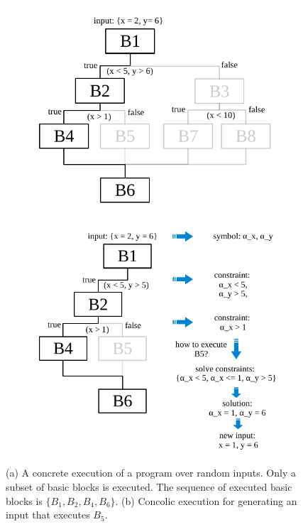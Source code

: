 \begin{figure}[t]
  \vspace{-3mm}
  \centering
  \begin{subfigure}{.5\textwidth}
    \centering
    \includegraphics[width=0.7\columnwidth]{images/concrete-execution} 
    \vspace{15mm}
    \caption{}
  \end{subfigure}%
  \begin{subfigure}{.5\textwidth}
    \centering
    \includegraphics[width=0.8\columnwidth]{images/concolic-execution} 
    \caption{}
  \end{subfigure}
  \caption{(a) A concrete execution of a program over random inputs. Only a subset of basic blocks is executed. The sequence of executed basic blocks is $\{B_1, B_2, B_4, B_6\}$. (b) Concolic execution for generating an input that executes $B_5$.}
  \label{fig:example-concrete-execution}
  \vspace{-3mm}
\end{figure}

